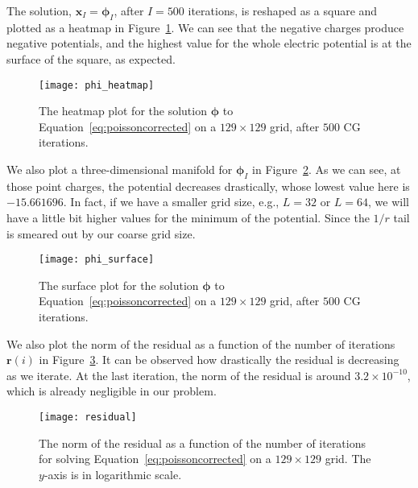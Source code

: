 The solution, \(\bm{x}_I = \bm{\phi}_I\), after \(I=500\) iterations, is reshaped
as a square and plotted as a heatmap in Figure~\ref{fig:phi_heatmap}.
We can see that the negative charges produce negative potentials,
and the highest value for the whole electric potential is at the surface
of the square, as expected.
%
\begin{figure}[!hbt]
    \centering
    \texttt{[image: phi\_heatmap]}
    \caption{The heatmap plot for the solution \(\bm{\phi}\) to
        Equation~\eqref{eq:poissoncorrected} on a \(129 \times 129\) grid,
        after \(500\) CG iterations.}
    \label{fig:phi_heatmap}
\end{figure}
%
We also plot a three-dimensional manifold for \(\bm{\phi}_I\)
in Figure~\ref{fig:phi_surface}.
As we can see, at those point charges, the potential decreases drastically,
whose lowest value here is \(-15.661696\).
In fact, if we have a smaller grid size, e.g., \(L = 32\) or \(L = 64\),
we will have a little bit higher values for the minimum of the potential.
Since the \(1 / r\) tail is smeared out by our coarse grid size.
%
\begin{figure}[!hbt]
    \centering
    \texttt{[image: phi\_surface]}
    \caption{The surface plot for the solution \(\bm{\phi}\) to
        Equation~\eqref{eq:poissoncorrected} on a \(129 \times 129\) grid,
        after \(500\) CG iterations.}
    \label{fig:phi_surface}
\end{figure}

We also plot the norm of the residual as a function of the number of iterations
\(\bm{r}(i)\) in Figure~\ref{fig:residual}. It can be observed how drastically
the residual is decreasing as we iterate.
At the last iteration, the norm of the residual is around \(3.2 \times 10^{-10}\),
which is already negligible in our problem.
%
\begin{figure}[!hbt]
    \centering
    \texttt{[image: residual]}
    \caption{The norm of the residual as a function of the number of iterations for solving
        Equation~\eqref{eq:poissoncorrected} on a \(129 \times 129\) grid.
        The \(y\)-axis is in logarithmic scale.}
    \label{fig:residual}
\end{figure}
